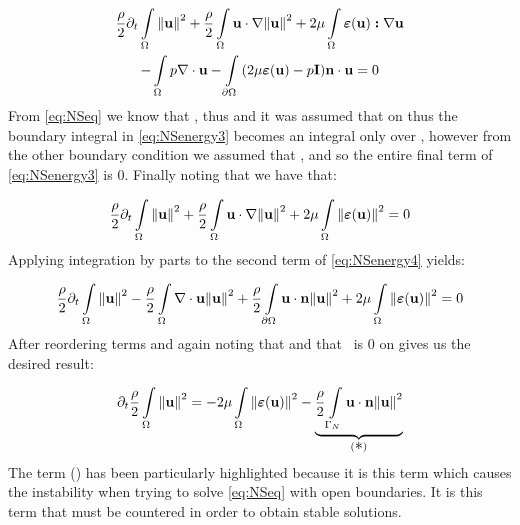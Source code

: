  \begin{multline}\label{eq:NSenergy3}
     \frac{\rho}{2}\partial_{t}\int\limits_{\Omega}\norm{{\textbf{u}}}^2 + \frac{\rho}{2}\int\limits_{\Omega}{\textbf{u}}\cdot\nabla\norm{{\textbf{u}}}^2 + 2\mu\int\limits_{\Omega}\bm{\varepsilon}({\textbf{u}}) \bm{:} \nabla{\textbf{u}}\\ - \int\limits_{\Omega} p\nabla\cdot{\textbf{u}} - \int\limits_{\partial\Omega}\qty(2\mu\bm{\varepsilon}({\textbf{u}}) - p\mathbf{I}){\textbf{n}} \cdot {\textbf{u}} = 0
 \end{multline}
 From \eqref{eq:NSeq} we know that , thus  and it was assumed that  on  thus the boundary integral in \eqref{eq:NSenergy3} becomes an integral only over , however from the other boundary condition we assumed that , and so the entire final term of \eqref{eq:NSenergy3} is 0. Finally noting that \mathm{\bm{\varepsilon}(\bmu) \bm{:} \nabla\bmu = \bm{\varepsilon}(\bmu) \bm{:} \bm{\varepsilon}(\bmu)} we have that:
 
 \begin{equation}\label{eq:NSenergy4}
     \frac{\rho}{2}\partial_{t}\int\limits_{\Omega}\norm{{\textbf{u}}}^2 + \frac{\rho}{2}\int\limits_{\Omega}{\textbf{u}}\cdot\nabla\norm{{\textbf{u}}}^2 + 2\mu\int\limits_{\Omega}\norm{\bm{\varepsilon}({\textbf{u}})}^2  = 0
 \end{equation}
 Applying integration by parts to the second term of \eqref{eq:NSenergy4} yields:
 
  \begin{equation}\label{eq:NSenergy5}
     \frac{\rho}{2}\partial_{t}\int\limits_{\Omega}\norm{{\textbf{u}}}^2 - \frac{\rho}{2}\int\limits_{\Omega}\nabla\cdot{\textbf{u}}\norm{{\textbf{u}}}^2 +
     \frac{\rho}{2}\int\limits_{\partial\Omega}{\textbf{u}}\cdot{\textbf{n}}\norm{{\textbf{u}}}^2 +
     2\mu\int\limits_{\Omega}\norm{\bm{\varepsilon}({\textbf{u}})}^2  = 0
 \end{equation}
 After reordering terms and again noting that  and that \bmu~is 0 on  gives us the desired result:
 
\begin{equation}\label{NSeqENergy}
\partial_t\frac{\rho}{2}\fint\norm{\bmu}^2 = -2\mu\fint\norm{\bm{\varepsilon}(\bmu)}^2 - \underbrace{\frac{\rho}{2}\bint\bmu\cdot\bmn\norm{\bmu}^2}_{(\text{\large \textasteriskcentered})}
\end{equation}
The term ({\large \textasteriskcentered}) has been particularly highlighted because it is this term which causes the instability when trying to solve \autoref{eq:NSeq} with open boundaries. It is this term that must be countered in order to obtain stable solutions.

